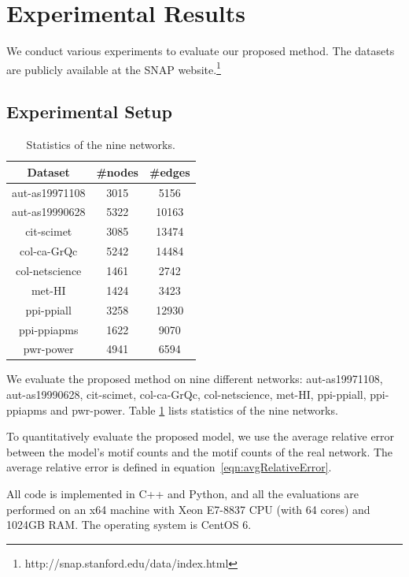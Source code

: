 \section{Experimental Results}
\label{sec:exp}

We conduct various experiments to evaluate our proposed method.  The datasets are publicly available at the SNAP website.\footnote{http://snap.stanford.edu/data/index.html}

\subsection{Experimental Setup}

\begin{table}[t]
\centering
\begin{tabular}{|c|c@{ }|c@{ }|}
\hline
Dataset             &   \#nodes       &   \#edges \\ \hline
aut-as19971108 & 3015 & 5156 \\\hline
aut-as19990628 & 5322 & 10163 \\\hline
cit-scimet & 3085 & 13474 \\\hline
col-ca-GrQc & 5242 & 14484 \\\hline
col-netscience & 1461 & 2742 \\\hline
met-HI & 1424 & 3423 \\\hline
ppi-ppiall & 3258 & 12930 \\\hline
ppi-ppiapms & 1622 & 9070 \\\hline
pwr-power & 4941 & 6594 \\\hline
\end{tabular}
\caption{Statistics of the nine networks.}
\label{tb:statistics}
\end{table}


 We evaluate the proposed method on nine different networks: aut-as19971108, aut-as19990628, cit-scimet, col-ca-GrQc, col-netscience, met-HI, ppi-ppiall, ppi-ppiapms and pwr-power.
Table \ref{tb:statistics} lists statistics of the nine networks. 

 To quantitatively evaluate the proposed model, we use the average relative error between the model's motif counts and the motif counts of the real network.  The average relative error is defined in equation~\ref{eqn:avgRelativeError}.

All code is implemented in C++ and Python, and all the evaluations are performed on an x64 machine with Xeon E7-8837 CPU (with 64 cores) and 1024GB RAM. The operating system is CentOS 6. 

